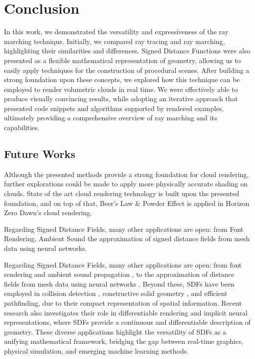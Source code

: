 \chapter{Conclusion}\label{chp:LABEL_CHP_5}

In this work, we demonstrated the versatility and expressiveness of the ray marching technique. Initially, we compared ray tracing and ray marching, highlighting their similarities and differences. Signed Distance Functions were also presented as a flexible mathematical representation of 
geometry, allowing us to easily apply techniques for the construction of procedural scenes. After building a strong foundation upon these concepts, we explored how this technique can be employed to render volumetric clouds in real time. We were effectively able to produce visually convincing results, while adopting an iterative approach that presented code snippets and algorithms supported by rendered examples, ultimately providing a comprehensive overview of ray marching and its capabilities.

\section{Future Works}

Although the presented methods provide a strong foundation for cloud rendering, further explorations could be made to apply more physically accurate shading on clouds. State of the art cloud rendering technology is built upon the presented foundation, and on top of that, Beer's Law & Powder Effect is applied in Horizon Zero Dawn's cloud rendering. %

Regarding Signed Distance Fields, many other applications are open: from Font Rendering, Ambient Sound the approximation of signed distance fields from mesh data using neural networks. 

Regarding Signed Distance Fields, many other applications are open: from font rendering 
\cite{green2007siggraph} and ambient sound propagation \cite{tiagocesar}, to the 
approximation of distance fields from mesh data using neural networks 
\cite{atzmon2019sal, park2019deepsdf}. Beyond these, SDFs have been employed in collision 
detection \cite{van2011sdfcollisions}, constructive solid geometry 
\cite{hart1996csgeometry}, and efficient pathfinding, due to their compact representation 
of spatial information. Recent research also investigates their role in differentiable 
rendering \cite{nimier2020differentiable} and implicit neural representations, where SDFs 
provide a continuous and differentiable description of geometry. These diverse 
applications highlight the versatility of SDFs as a unifying mathematical framework, 
bridging the gap between real-time graphics, physical simulation, and emerging machine 
learning methods.

